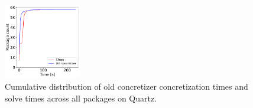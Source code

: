 
\begin{figure}[htb]

    \centering
    \includegraphics[width=0.3\textwidth]{figures/perf/cdf_quartz_old_vs_clingo.pdf}
    \caption{Cumulative distribution of old concretizer concretization times and \clingo{} solve times across all packages on Quartz.}
    \label{fig:cdf_quartz_old_vs_new}

\end{figure}
